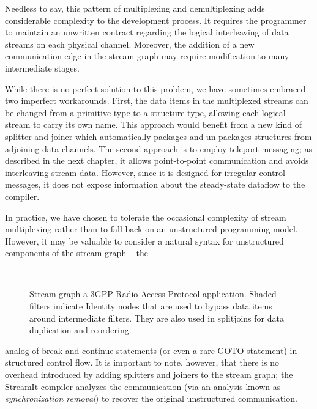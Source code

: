 \begin{enumerate}
  Needless to say, this pattern of multiplexing and demultiplexing
  adds considerable complexity to the development process.  It
  requires the programmer to maintain an unwritten contract regarding
  the logical interleaving of data streams on each physical channel.
  Moreover, the addition of a new communication edge in the stream
  graph may require modification to many intermediate stages.

  While there is no perfect solution to this problem, we have
  sometimes embraced two imperfect workarounds.  First, the data items
  in the multiplexed streams can be changed from a primitive type to a
  structure type, allowing each logical stream to carry its own name.
  This approach would benefit from a new kind of splitter and joiner
  which automatically packages and un-packages structures from
  adjoining data channels.  The second approach is to employ teleport
  messaging; as described in the next chapter, it allows
  point-to-point communication and avoids interleaving stream data.
  However, since it is designed for irregular control messages, it
  does not expose information about the steady-state dataflow to the
  compiler.

  In practice, we have chosen to tolerate the occasional complexity of
  stream multiplexing rather than to fall back on an unstructured
  programming model.  However, it may be valuable to consider a
  natural syntax for unstructured components of the stream graph --
  the 
%
\begin{figure}[t]
\vspace{-0.96in}
\vspace{-1.25in} ~ \\
\begin{minipage}{4in}
\caption[Stream graph for 3GPP]{Stream graph a 3GPP Radio Access
  Protocol application.  Shaded filters indicate Identity nodes that
  are used to bypass data items around intermediate filters.  They are
  also used in splitjoins for data duplication and
  reordering.\protect\label{fig:3gpp}}
\end{minipage}
\end{figure}
\clearpage
%
\noindent analog of break and continue statements (or even a rare GOTO
statement) in structured control flow. It is important to note,
however, that there is no overhead introduced by adding splitters and
joiners to the stream graph; the StreamIt compiler analyzes the
communication (via an analysis known as {\it synchronization removal})
to recover the original unstructured communication.


\end{enumerate}
